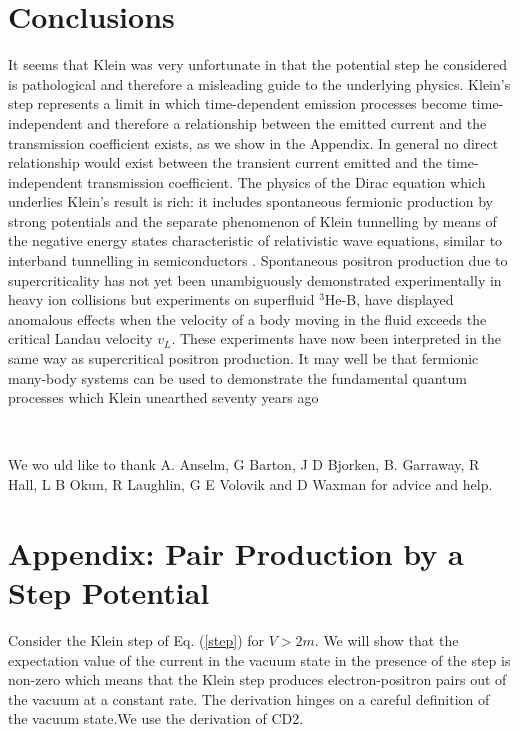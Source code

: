 \section{Conclusions}

\noindent It seems that Klein was very unfortunate in that the potential
step he considered is pathological and therefore a misleading guide to the
underlying physics. Klein's step represents a limit in which time-dependent
emission processes become time-independent and therefore a relationship
between the emitted current and the transmission coefficient exists, as we
show in the Appendix. In general no direct relationship would exist between
the transient current emitted and the time-independent transmission
coefficient. The physics of the Dirac equation which underlies Klein's
result is rich: it includes spontaneous fermionic production by strong
potentials and the separate phenomenon of Klein tunnelling by means of the
negative energy states characteristic of relativistic wave equations,
similar to interband tunnelling in semiconductors \cite{semi}. Spontaneous
positron production due to supercriticality has not yet been unambiguously
demonstrated experimentally in heavy ion collisions but experiments on
superfluid $^3$He-B\cite{lanc1}, \cite{lanc2} have displayed anomalous
effects when the velocity of a body moving in the fluid exceeds the critical
Landau velocity $v_L$. These experiments have now been interpreted in the
same way as supercritical positron production\cite{cv}. It may well be that
fermionic many-body systems can be used to demonstrate the fundamental
quantum processes which Klein unearthed seventy years ago

\smallskip\ 

\noindent We wo uld like to thank A. Anselm, G Barton, J D Bjorken, B.
Garraway, R Hall, L B Okun, R Laughlin, G E Volovik and D Waxman for advice
and help.

\section{Appendix: Pair Production by a Step Potential}

\noindent Consider the Klein step of Eq. (\ref{step}) for $V>2m$. We will
show that the expectation value of the current in the vacuum state in the
presence of the step is non-zero which means that the Klein step produces
electron-positron pairs out of the vacuum at a constant rate. The derivation
hinges on a careful definition of the vacuum state.We use the derivation of
CD2\cite{kleinf}.

